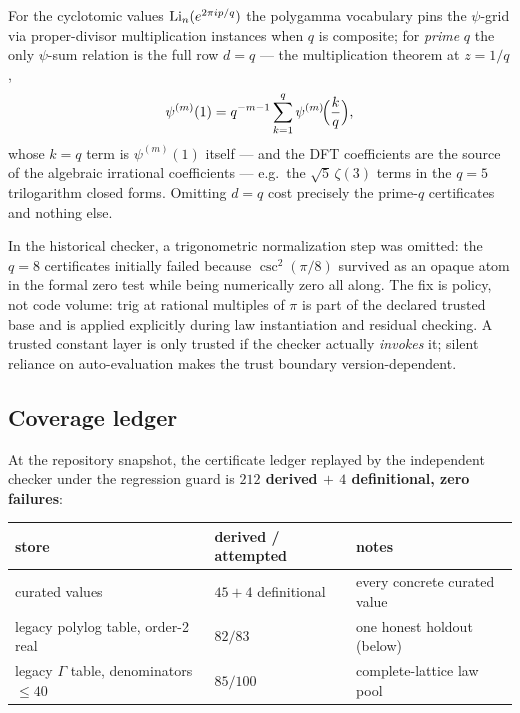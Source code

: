 \begin{finding}\label{gamma:find:primeq}
For the cyclotomic values $\operatorname{Li}_n(e^{2\pi ip/q})$ the polygamma vocabulary pins the
$\psi$-grid via proper-divisor multiplication instances when $q$ is composite; for
\emph{prime} $q$ the only $\psi$-sum relation is the full row $d=q$ --- the multiplication
theorem at $z=1/q$,
\[
\psi^{(m)}(1)=q^{-m-1}\sum_{k=1}^{q}\psi^{(m)}\!\Bigl(\frac{k}{q}\Bigr),
\]
whose $k=q$ term is $\psi^{(m)}(1)$ itself --- and the DFT coefficients are the source of the algebraic irrational coefficients --- e.g.\ the
$\sqrt5\,\zeta(3)$ terms in the $q=5$ trilogarithm closed forms. Omitting $d=q$ cost
precisely the prime-$q$ certificates and nothing else.
\end{finding}

\begin{finding}\label{gamma:find:trig}
In the historical checker, a trigonometric normalization step was omitted: the $q=8$ certificates
initially failed because $\csc^2(\pi/8)$ survived as an opaque atom in the formal zero
test while being numerically zero all along. The fix is policy, not code volume: trig at
rational multiples of $\pi$ is part of the declared trusted base and is applied explicitly
during law instantiation and residual checking. A trusted constant layer is only trusted
if the checker actually \emph{invokes} it; silent reliance on auto-evaluation makes the
trust boundary version-dependent.
\end{finding}

\subsection{Coverage ledger}

At the repository snapshot, the certificate ledger replayed by the independent checker
under the regression guard is \textbf{$212$ derived $+$ $4$ definitional, zero failures}:

\begin{center}
\begin{tabular}{l l l}
\toprule
store & derived / attempted & notes\\
\midrule
curated values & $45+4$ definitional & every concrete curated value\\
legacy polylog table, order-2 real & $82/83$ & one honest holdout (below)\\
legacy $\Gamma$ table, denominators $\le40$ & $85/100$ & complete-lattice law pool\\
\bottomrule
\end{tabular}
\end{center}

